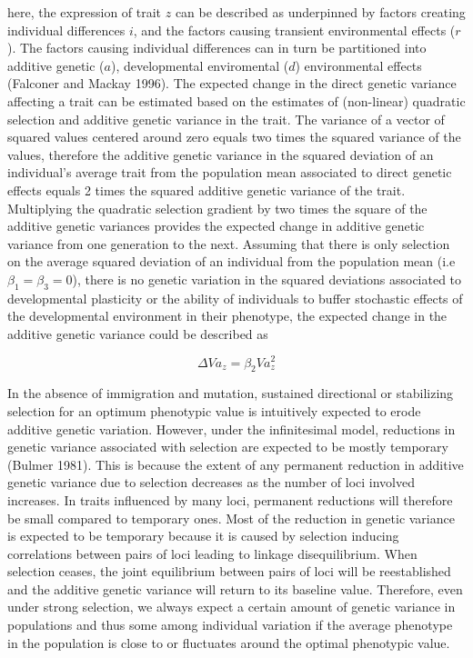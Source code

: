 \documentclass{article}
\begin{document}
here, the expression of trait $z$ can be described as underpinned by factors creating individual differences $i$, and the factors causing transient environmental effects ($r$). The factors causing individual differences can in turn be partitioned into additive genetic ($a$), developmental enviromental ($d$) environmental effects (Falconer and Mackay 1996). The expected change in the direct genetic variance affecting a trait can be estimated based on the estimates of (non-linear) quadratic selection and additive genetic variance in the trait. The variance of a vector of squared values centered around zero equals two times the squared variance of the values, therefore the additive genetic variance in the squared deviation of an individual’s average trait from the population mean associated to direct genetic effects equals 2 times the squared additive genetic variance of the trait. Multiplying the quadratic selection gradient by two times the square of the additive genetic variances provides the expected change in additive genetic variance from one generation to the next. Assuming that there is only selection on the average squared deviation of an individual from the population mean (i.e $\beta_1=\beta_3=0$), there is no genetic variation in the squared deviations associated to developmental plasticity or the ability of individuals to buffer stochastic effects of the developmental environment in their phenotype, the expected change in the additive genetic variance could be described as

\begin{equation}
\Delta Va_z = \beta_2 Va_{z}^2
\end{equation}

In the absence of immigration and mutation, sustained directional or stabilizing selection for an optimum phenotypic value is intuitively expected to erode additive genetic variation. However, under the infinitesimal model, reductions in genetic variance associated with selection are expected to be mostly temporary (Bulmer 1981). This is because the extent of any permanent reduction in additive genetic variance due to selection decreases as the number of loci involved increases. In traits influenced by many loci, permanent reductions will therefore be small compared to temporary ones. Most of the reduction in genetic variance is expected to be temporary because it is caused by selection inducing correlations between pairs of loci leading to linkage disequilibrium. When selection ceases, the joint equilibrium between pairs of loci will be reestablished and the additive genetic variance will return to its baseline value. Therefore, even under strong selection, we always expect a certain amount of genetic variance in populations and thus some among individual variation if the average phenotype in the population is close to or fluctuates around the optimal phenotypic value.
\end{document}
